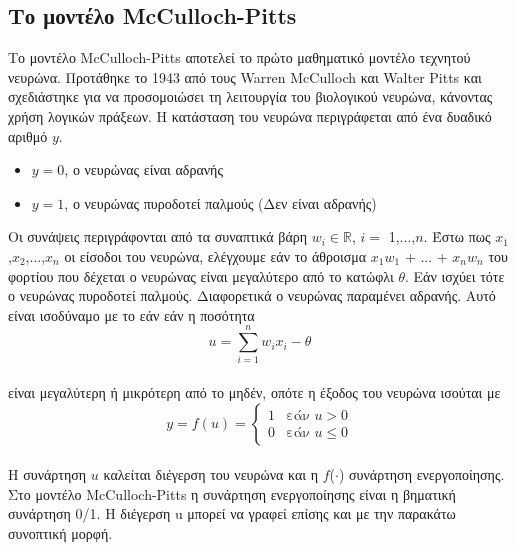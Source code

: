 \documentclass[12pt]{article}
\numberwithin{equation}{section}
\begin{document}
\subsection{Το μοντέλο McCulloch-Pitts}

Το μοντέλο McCulloch-Pitts αποτελεί το πρώτο μαθηματικό μοντέλο τεχνητού νευρώνα. Προτάθηκε το 1943 από τους Warren McCulloch και Walter Pitts και σχεδιάστηκε για να προσομοιώσει τη λειτουργία του βιολογικού νευρώνα, κάνοντας χρήση λογικών πράξεων. Η κατάσταση του νευρώνα περιγράφεται από ένα δυαδικό αριθμό \(y\).\\

\begin{itemize}
    \item \(y = 0\), ο νευρώνας είναι αδρανής
    \item \(y = 1\), ο νευρώνας πυροδοτεί παλμούς (Δεν είναι αδρανής)\\
\end{itemize}

Οι συνάψεις περιγράφονται από τα συναπτικά βάρη \(w_i \in \mathbb{R}\), \(i =\) 1,...,\(n\). Έστω πως \(x_1\),\(x_2\),...,\(x_n\) οι είσοδοι του νευρώνα, ελέγχουμε εάν το άθροισμα \(x_1w_1\) + ... + \(x_nw_n\) του φορτίου που δέχεται ο νευρώνας είναι μεγαλύτερο από το κατώφλι \(\theta\). Εάν ισχύει τότε ο νευρώνας πυροδοτεί παλμούς. Διαφορετικά ο νευρώνας παραμένει αδρανής. Αυτό είναι ισοδύναμο με το εάν εάν η ποσότητα\\


\begin{equation}
u = \sum_{i=1}^{n} w_i x_i - \theta
\label{eq:equation1}
\end{equation}\\

\noindent είναι μεγαλύτερη ή μικρότερη από το μηδέν, οπότε η έξοδος του νευρώνα ισούται με\\

\begin{equation}
y = f(u) =
\begin{cases}
1 & \text{εάν } u > 0 \\
0 & \text{εάν } u \leq 0
\end{cases}
\end{equation}\\

\noindent Η συνάρτηση \(u\) καλείται διέγερση του νευρώνα και η \(f\)(\(\cdot\)) συνάρτηση ενεργοποίησης. Στο μοντέλο McCulloch-Pitts η συνάρτηση ενεργοποίησης είναι η βηματική συνάρτηση 0/1. Η διέγερση u μπορεί να γραφεί επίσης και με την παρακάτω συνοπτική μορφή.\\
\end{document}
